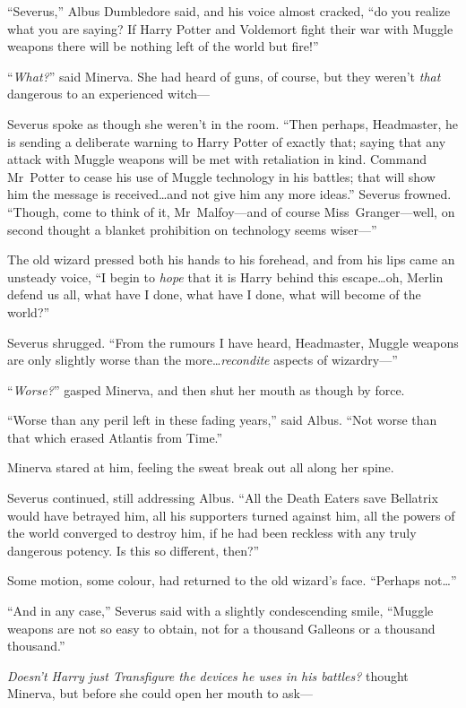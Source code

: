 “Severus,” Albus Dumbledore said, and his voice almost cracked, “do you realize what you are saying? If Harry Potter and Voldemort fight their war with Muggle weapons there will be nothing left of the world but fire!”

“\emph{What?}” said Minerva. She had heard of guns, of course, but they weren’t \emph{that} dangerous to an experienced witch—

Severus spoke as though she weren’t in the room. “Then perhaps, Headmaster, he is sending a deliberate warning to Harry Potter of exactly that; saying that any attack with Muggle weapons will be met with retaliation in kind. Command Mr~Potter to cease his use of Muggle technology in his battles; that will show him the message is received…and not give him any more ideas.” Severus frowned. “Though, come to think of it, Mr~Malfoy—and of course Miss~Granger—well, on second thought a blanket prohibition on technology seems wiser—”

The old wizard pressed both his hands to his forehead, and from his lips came an unsteady voice, “I begin to \emph{hope} that it is Harry behind this escape…oh, Merlin defend us all, what have I done, what have I done, what will become of the world?”

Severus shrugged. “From the rumours I have heard, Headmaster, Muggle weapons are only slightly worse than the more…\emph{recondite} aspects of wizardry—”

“\emph{Worse?}” gasped Minerva, and then shut her mouth as though by force.

“Worse than any peril left in these fading years,” said Albus. “Not worse than that which erased Atlantis from Time.”

Minerva stared at him, feeling the sweat break out all along her spine.

Severus continued, still addressing Albus. “All the Death Eaters save Bellatrix would have betrayed him, all his supporters turned against him, all the powers of the world converged to destroy him, if he had been reckless with any truly dangerous potency. Is this so different, then?”

Some motion, some colour, had returned to the old wizard’s face. “Perhaps not…”

“And in any case,” Severus said with a slightly condescending smile, “Muggle weapons are not so easy to obtain, not for a thousand Galleons or a thousand thousand.”

\emph{Doesn’t Harry just Transfigure the devices he uses in his battles?} thought Minerva, but before she could open her mouth to ask—

